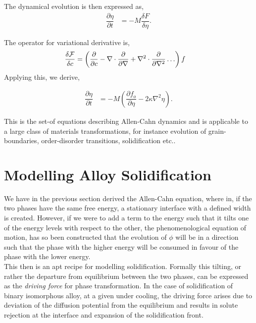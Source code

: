 \documentclass[12pt,a4paper]{report}
\begin{document}
The dynamical evolution is then expressed as,
\begin{align}
 \dfrac{\partial \eta}{\partial t} &= -M \dfrac{\delta F}{\delta \eta}.
\end{align}

The operator for variational derivative is,
\begin{align}
 \dfrac{\delta {\cal F}}{\delta c} &= \left(\dfrac{\partial}{\partial c} - 
 \nabla \cdot \dfrac{\partial}{\partial \nabla} + \nabla^{2}\cdot\dfrac{\partial }{\partial \nabla^{2}}\ldots\right)f  
 \label{variational_derivative}
\end{align}
Applying this, we derive,

\begin{align}
 \dfrac{\partial \eta}{\partial t} &= -M \left(\dfrac{\partial f_o}{\partial \eta} - 2\kappa\nabla^{2}\eta\right).
\end{align}
 
This is the set-of equations describing Allen-Cahn dynamics and is applicable to a large 
class of materials transformations, for instance evolution of grain-boundaries, 
order-disorder transitions, solidification etc.. 

\section{Modelling Alloy Solidification}

We have in the previous section derived the Allen-Cahn equation, where in, 
if the two phases have the same free energy, a stationary interface with
a defined width is created. However, if we were to add a term to the energy 
such that it tilts one of the energy levels with respect 
to the other, the phenomenological equation of motion, has so been constructed 
that the evolution of $\phi$ will be in a direction such that the phase 
with the higher energy will be consumed in favour of the phase with the lower energy.\\

This then is an apt recipe for modelling solidification. Formally this tilting, or 
rather the departure from equilibrium between the two phases, can be expressed as the 
\textit{driving force} for phase transformation.
In the case of solidification of binary isomorphous alloy, at a given under cooling, 
the driving force arises due to deviation of the diffusion potential from the equilibrium 
and results in solute rejection at the interface and expansion
of the solidification front.
\end{document}
